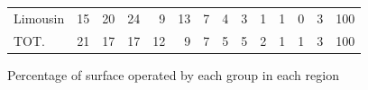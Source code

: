 \documentclass[11pt]{article}
\begin{document}
\begin{table}[H]
\begin{tabular}{lrrrrrrrrrrrrr}
Limousin             &         15 &         20 &         24 &          9 &         13 &          7 &          4 &          3 &          1 &          1 &          0 &          3 &        100 \\
TOT.                 &         21 &         17 &         17 &         12 &          9 &          7 &          5 &          5 &          2 &          1 &          1 &          3 &        100 \\
\bottomrule
\end{tabular}

\end{table}

\begin{table}[H]
\caption{Percentage of surface operated by each group in each region}
\footnotesize
\setlength{\tabcolsep}{2pt}


\end{table}
\end{document}
